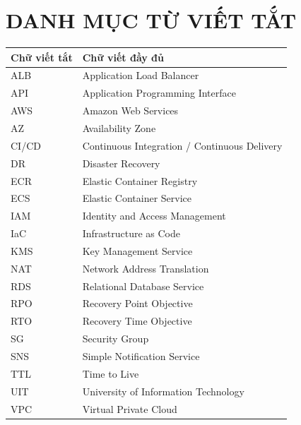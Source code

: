 \chapter*{DANH MỤC TỪ VIẾT TẮT}

\begin{table}[h]
    \centering
    \begin{tabularx}{\textwidth}{l X}
    \toprule
    \textbf{Chữ viết tắt} & \textbf{Chữ viết đầy đủ} \\
    \midrule
    ALB & Application Load Balancer \\
    API & Application Programming Interface \\
    AWS & Amazon Web Services \\
    AZ & Availability Zone \\
    CI/CD & Continuous Integration / Continuous Delivery \\
    DR & Disaster Recovery \\
    ECR & Elastic Container Registry \\
    ECS & Elastic Container Service \\
    IAM & Identity and Access Management \\
    IaC & Infrastructure as Code \\
    KMS & Key Management Service \\
    NAT & Network Address Translation \\
    RDS & Relational Database Service \\
    RPO & Recovery Point Objective \\
    RTO & Recovery Time Objective \\
    SG & Security Group \\
    SNS & Simple Notification Service \\
    TTL & Time to Live \\
    UIT & University of Information Technology \\
    VPC & Virtual Private Cloud \\
    \bottomrule
    \end{tabularx}
\end{table}
